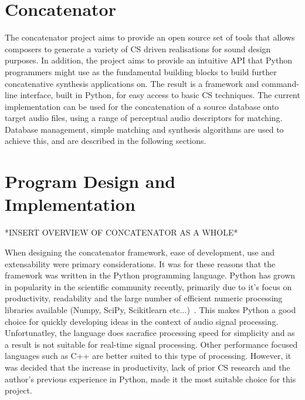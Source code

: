 \documentclass{scrartcl}
\begin{document}
    \section*{Concatenator}
    The concatenator project aims to provide an open source set of tools that
    allows composers to generate a variety of CS driven realisations for
    sound design purposes.  In addition, the project aims to provide an
    intuitive API that Python programmers might use as the fundamental building
    blocks to build further concatenative synthesis applications on.  
    The result is a framework and command-line interface, built in Python, for
    easy access to basic CS techniques.   
    The current implementation can be used for the concatenation of a source
    database onto target audio files, using a range of perceptual audio
    descriptors for matching. Database management, simple matching and
    synthesis algorithms are used to achieve this, and are described in the
    following sections.

    \section*{Program Design and Implementation}
    *INSERT OVERVIEW OF CONCATENATOR AS A WHOLE*

    When designing the concatenator framework, ease of development, use and
    extensability were primary considerations. It was for these reasons that
    the framework was written in the Python programming language. Python has
    grown in popularity in the scientific community recently, primarily due to
    it's focus on productivity, readability and the large number of efficient
    numeric processing libraries available (Numpy, SciPy, Scikitlearn
    etc...)~\parencite[p.11]{Fangohr2014}. This makes Python a good choice for
    quickly developing ideas in the context of audio signal processing.
    Unfortunatley, the language does sacrafice processing speed for simplicity
    and as a result is not suitable for real-time signal processing. Other
    performance focused languages such as C++ are better suited to this type of
    processing. However, it was decided that the increase in productivity, lack
    of prior CS research and the author's previous experience in Python,
    made it the most suitable choice for this project.\\
\end{document}
